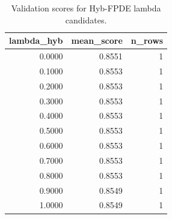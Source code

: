 \begin{table}[t]
\caption{Validation scores for Hyb-FPDE lambda candidates.}
\label{tab:lambda_distribution_computed}
\centering
\begin{tabular}{rrr}
\toprule
lambda\_hyb & mean\_score & n\_rows \\
\midrule
0.0000 & 0.8551 & 1 \\
0.1000 & 0.8553 & 1 \\
0.2000 & 0.8553 & 1 \\
0.3000 & 0.8553 & 1 \\
0.4000 & 0.8553 & 1 \\
0.5000 & 0.8553 & 1 \\
0.6000 & 0.8553 & 1 \\
0.7000 & 0.8553 & 1 \\
0.8000 & 0.8553 & 1 \\
0.9000 & 0.8549 & 1 \\
1.0000 & 0.8549 & 1 \\
\bottomrule
\end{tabular}

\end{table}
